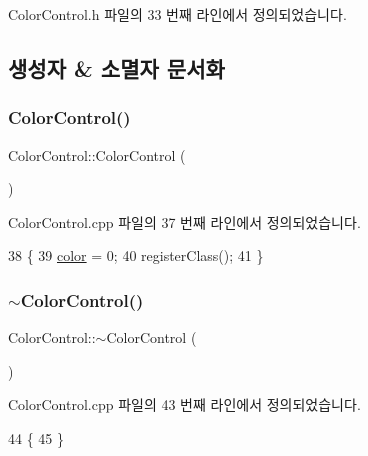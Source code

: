 Color\+Control.\+h 파일의 33 번째 라인에서 정의되었습니다.



\subsection{생성자 \& 소멸자 문서화}
\mbox{\label{class_color_control_aa3a2f4bc5ea3e434a6a8698a0a9ec20b}} 
\subsubsection{\texorpdfstring{Color\+Control()}{ColorControl()}}
{\footnotesize\ttfamily Color\+Control\+::\+Color\+Control (\begin{DoxyParamCaption}{ }\end{DoxyParamCaption})}



Color\+Control.\+cpp 파일의 37 번째 라인에서 정의되었습니다.


\begin{DoxyCode}
38 \{
39   \mbox{\hyperlink{class_color_control_adda78267113753c247e7edcaae47f927}{color}} = 0;
40   registerClass();
41 \}
\end{DoxyCode}
\mbox{\label{class_color_control_a64019379e271bec02b8402c18ff7397f}} 
\subsubsection{\texorpdfstring{$\sim$\+Color\+Control()}{~ColorControl()}}
{\footnotesize\ttfamily Color\+Control\+::$\sim$\+Color\+Control (\begin{DoxyParamCaption}{ }\end{DoxyParamCaption})\hspace{0.3cm}{\ttfamily [virtual]}}



Color\+Control.\+cpp 파일의 43 번째 라인에서 정의되었습니다.


\begin{DoxyCode}
44 \{
45 \}
\end{DoxyCode}


